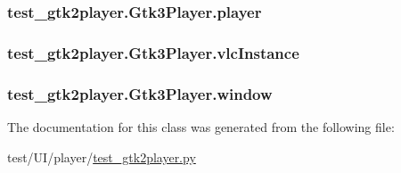 \subsubsection[{player}]{\setlength{\rightskip}{0pt plus 5cm}test\+\_\+gtk2player.\+Gtk3\+Player.\+player}\label{classtest__gtk2player_1_1Gtk3Player_a8b60cad6d83a556f9e11a8f34fb71438}
\hypertarget{classtest__gtk2player_1_1Gtk3Player_a51e16b4212f5b3b4f3d69ab29b0184f4}{}
\subsubsection[{vlc\+Instance}]{\setlength{\rightskip}{0pt plus 5cm}test\+\_\+gtk2player.\+Gtk3\+Player.\+vlc\+Instance}\label{classtest__gtk2player_1_1Gtk3Player_a51e16b4212f5b3b4f3d69ab29b0184f4}
\hypertarget{classtest__gtk2player_1_1Gtk3Player_a3f48215e560950eee357a3649cfd1ed0}{}
\subsubsection[{window}]{\setlength{\rightskip}{0pt plus 5cm}test\+\_\+gtk2player.\+Gtk3\+Player.\+window}\label{classtest__gtk2player_1_1Gtk3Player_a3f48215e560950eee357a3649cfd1ed0}


The documentation for this class was generated from the following file\+:\begin{DoxyCompactItemize}
\item 
test/\+U\+I/player/\hyperlink{test__gtk2player_8py}{test\+\_\+gtk2player.\+py}\end{DoxyCompactItemize}
